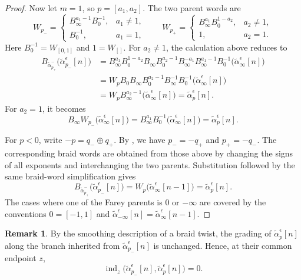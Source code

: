 \documentclass[11pt,a4paper,reqno]{amsart}%
\theoremstyle{plain}
\theoremstyle{definition}
\newtheorem{remark}[remark]{Remark}
\numberwithin{equation}{section}
\numberwithin{equation}{section}
\newcommand{\gind}{\operatorname{ind}\nolimits}
\begin{document}
\begin{proof}
Now let $m=1$, so $p=[a_1,a_2]$. The two parent words are
\[
W_{p_-}=
\begin{cases}
B_\infty^{a_1-1}B_0^{-1},&a_1\ne1,\\
B_0^{-1},&a_1=1,
\end{cases}
\qquad
W_{p_+}=
\begin{cases}
B_\infty^{a_1}B_0^{1-a_2},&a_2\ne1,\\
1,&a_2=1.
\end{cases}
\]
Here $B_0^{-1}=W_{[0,1]}$ and $1=W_{[]}$. For $a_2\ne1$, the calculation above
reduces to
\[
\begin{aligned}
B_{\widetilde{\alpha}_{p_+}^{-}}
\bigl(\widetilde{\alpha}_{p_-}^\epsilon[n]\bigr)
&=B_\infty^{a_1}B_0^{1-a_2}B_\infty
  B_0^{a_2-1}B_\infty^{-a_1}B_\infty^{a_1-1}B_0^{-1}
  \bigl(\widetilde{\alpha}_\infty^\epsilon[n]\bigr)\\
&=W_pB_0B_\infty B_0^{a_2-1}B_\infty^{-1}B_0^{-1}
  \bigl(\widetilde{\alpha}_\infty^\epsilon[n]\bigr)\\
&=W_pB_\infty^{a_2-1}
  \bigl(\widetilde{\alpha}_\infty^\epsilon[n]\bigr)
 =\widetilde{\alpha}_p^\epsilon[n].
\end{aligned}
\]
For $a_2=1$, it becomes
\[
B_\infty W_{p_-}\bigl(\widetilde{\alpha}_\infty^\epsilon[n]\bigr)
=B_\infty^{a_1}B_0^{-1}
\bigl(\widetilde{\alpha}_\infty^\epsilon[n]\bigr)
=\widetilde{\alpha}_p^\epsilon[n].
\]

For $p<0$, write $-p=q_-\oplus q_+$. By
, we have $p_-=-q_+$ and $p_+=-q_-$. The
corresponding braid words are obtained from those above by changing the signs
of all exponents and interchanging the two parents. Substitution followed by
the same braid-word simplification gives
\[
B_{\widetilde{\alpha}_{p_+}^{-}}
\bigl(\widetilde{\alpha}_{p_-}^\epsilon[n]\bigr)
=W_p\bigl(\widetilde{\alpha}_\infty^\epsilon[n-1]\bigr)
=\widetilde{\alpha}_p^\epsilon[n].
\]
The cases where one of the Farey parents is $0$ or $-\infty$ are covered by
the conventions $0=[-1,1]$ and
$\widetilde{\alpha}_{-\infty}^\epsilon[n]
=\widetilde{\alpha}_\infty^\epsilon[n-1]$.
\end{proof}
\begin{remark}\label{rem:farey-smoothing-index}
By the smoothing description of a braid twist, the grading of
$\widetilde{\alpha}_p^\epsilon[n]$ along the branch inherited from
$\widetilde{\alpha}_{p_-}^\epsilon[n]$ is unchanged. Hence, at their common
endpoint $z$,
\[
\gind_z\bigl(\widetilde{\alpha}_{p_-}^\epsilon[n],
\widetilde{\alpha}_p^\epsilon[n]\bigr)=0.
\]
\end{remark}
\end{document}
